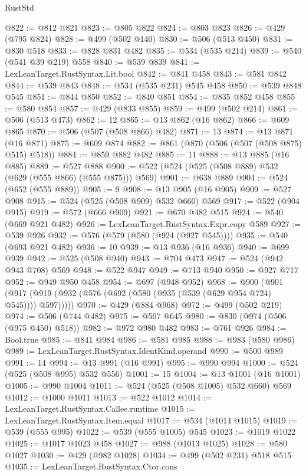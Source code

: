 \begin{lexlean}{RustStd}
\begin{coremodule}
@822 := @812 @821
@823 := @805 @822
@824 := @803 @823
@826 := @429 (@795 @824)
@828 := @499 (@502 @140)
@830 := @506 (@513 @450)
@831 := @830 @518
@833 := @828 @831 @482
@835 := @534 (@535 @214)
@839 := @540 (@541 @39 @219) @558
@840 := @539 @839
@841 := LexLeanTarget.RustSyntax.Lit.bool
@842 := @841 @458
@843 := @581 @842
@844 := @539 @843
@848 := @534 (@535 @231) @545 @458
@850 := @539 @848 @545
@851 := @844 @850
@852 := @840 @851
@854 := @835 @852 @458
@855 := @580 @854
@857 := @429 (@833 @855)
@859 := @499 (@502 @214)
@861 := @506 (@513 @473)
@862 := 12
@865 := @13 @862 (@16 @862)
@866 := @609 @865
@870 := @506 (@507 (@508 @866) @482)
@871 := 13
@874 := @13 @871 (@16 @871)
@875 := @609 @874
@882 := @861 (@870 (@506 (@507 (@508 @875) @515) @518))
@884 := @859 @882 @482
@885 := 11
@888 := @13 @885 (@16 @885)
@889 := @527 @888
@900 := @522 (@524 (@525 (@508 @889) @532 (@629 (@555 @866) (@555 @875))) @569)
@901 := @638 @889
@904 := @524 (@652 (@555 @889))
@905 := 9
@908 := @13 @905 (@16 @905)
@909 := @527 @908
@915 := @524 (@525 (@508 @909) @532 @660) @569
@917 := @522 (@904 @915)
@919 := @572 (@666 @909)
@921 := @670 @482 @515
@924 := @540 (@669 @921 @482)
@926 := LexLeanTarget.RustSyntax.Expr.copy @589
@927 := @539 @926
@932 := @576 (@579 (@580 (@924 (@927 @545))))
@935 := @540 (@693 @921 @482)
@936 := 10
@939 := @13 @936 (@16 @936)
@940 := @699 @939
@942 := @525 (@508 @940)
@943 := @704 @473
@947 := @524 (@942 @943 @708) @569
@948 := @522 @947
@949 := @713 @940
@950 := @927 @717
@952 := @949 @950 @458
@954 := @697 (@948 @952)
@968 := @900
    (@901 (@917 (@919 (@932 (@576 (@692 (@580 (@935 (@539 (@629 @954 @724) @545)))) @597)))))
@970 := @429 (@884 @968)
@972 := @499 (@502 @219)
@974 := @506 (@744 @482)
@975 := @507 @645
@980 := @830 (@974 (@506 (@975 @450) @518))
@982 := @972 @980 @482
@983 := @761 @926
@984 := Bool.true
@985 := @841 @984
@986 := @581 @985
@988 := @983 (@580 @986)
@989 := LexLeanTarget.RustSyntax.IdentKind.operand
@990 := @500 @989
@991 := 14
@994 := @13 @991 (@16 @991)
@995 := @990 @994
@1000 := @524 (@525 (@508 @995) @532 @556)
@1001 := 15
@1004 := @13 @1001 (@16 @1001)
@1005 := @990 @1004
@1011 := @524 (@525 (@508 @1005) @532 @660) @569
@1012 := @1000 @1011
@1013 := @522 @1012
@1014 := LexLeanTarget.RustSyntax.Callee.runtime
@1015 := LexLeanTarget.RustSyntax.Item.equal
@1017 := @534 (@1014 @1015)
@1019 := @539 (@555 @995)
@1022 := @539 (@555 @1005) @545
@1023 := @1019 @1022
@1025 := @1017 @1023 @458
@1027 := @988 (@1013 @1025)
@1028 := @580 @1027
@1030 := @429 (@982 @1028)
@1034 := @499 (@502 @231) @518 @515
@1035 := LexLeanTarget.RustSyntax.Ctor.cons

\end{coremodule}
\end{lexlean}
